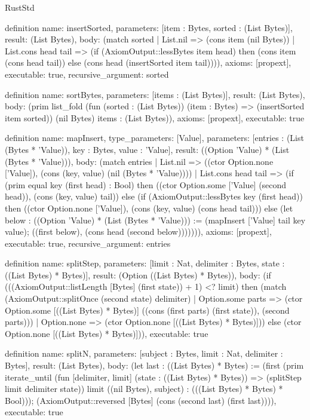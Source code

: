 \begin{lexlean}{RustStd}
\begin{semanticmodule}
definition{
  name: insertSorted,
  parameters: [item : Bytes, sorted : (List Bytes)],
  result: (List Bytes),
  body: (match sorted
    | List.nil => (cons item (nil Bytes))
    | List.cons head tail => (if (AxiomOutput::lessBytes item head) then (cons item (cons head tail)) else (cons head (insertSorted item tail)))),
  axioms: [propext],
  executable: true,
  recursive_argument: sorted
}

definition{
  name: sortBytes,
  parameters: [items : (List Bytes)],
  result: (List Bytes),
  body: (prim list_fold (fun (sorted : (List Bytes)) (item : Bytes) => (insertSorted item sorted)) (nil Bytes) items : (List Bytes)),
  axioms: [propext],
  executable: true
}

definition{
  name: mapInsert,
  type_parameters: [Value],
  parameters: [entries : (List (Bytes * 'Value)), key : Bytes, value : 'Value],
  result: ((Option 'Value) * (List (Bytes * 'Value))),
  body: (match entries
    | List.nil => ((ctor Option.none ['Value]), (cons (key, value) (nil (Bytes * 'Value))))
    | List.cons head tail => (if (prim equal key (first head) : Bool) then ((ctor Option.some ['Value] (second head)), (cons (key, value) tail)) else (if (AxiomOutput::lessBytes key (first head)) then ((ctor Option.none ['Value]), (cons (key, value) (cons head tail))) else (let below : ((Option 'Value) * (List (Bytes * 'Value))) := (mapInsert ['Value] tail key value); ((first below), (cons head (second below))))))),
  axioms: [propext],
  executable: true,
  recursive_argument: entries
}

definition{
  name: splitStep,
  parameters: [limit : Nat, delimiter : Bytes, state : ((List Bytes) * Bytes)],
  result: (Option ((List Bytes) * Bytes)),
  body: (if (((AxiomOutput::listLength [Bytes] (first state)) + 1) <? limit) then (match (AxiomOutput::splitOnce (second state) delimiter)
    | Option.some parts => (ctor Option.some [((List Bytes) * Bytes)] ((cons (first parts) (first state)), (second parts)))
    | Option.none => (ctor Option.none [((List Bytes) * Bytes)])) else (ctor Option.none [((List Bytes) * Bytes)])),
  executable: true
}

definition{
  name: splitN,
  parameters: [subject : Bytes, limit : Nat, delimiter : Bytes],
  result: (List Bytes),
  body: (let last : ((List Bytes) * Bytes) := (first (prim iterate_until (fun [delimiter, limit] (state : ((List Bytes) * Bytes)) => (splitStep limit delimiter state)) limit ((nil Bytes), subject) : (((List Bytes) * Bytes) * Bool))); (AxiomOutput::reversed [Bytes] (cons (second last) (first last)))),
  executable: true
}


\end{semanticmodule}
\end{lexlean}
